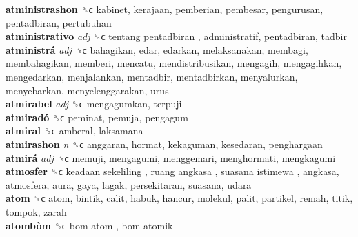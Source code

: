 \textbf{atministrashon} ␝ϲ  kabinet, kerajaan, pemberian, pembesar, pengurusan, pentadbiran, pertubuhan  \\
\textbf{atministrativo} \emph{adj}  ␝ϲ   tentang pentadbiran , administratif, pentadbiran, tadbir  \\
\textbf{atministrá} \emph{adj}  ␝ϲ  bahagikan, edar, edarkan, melaksanakan, membagi, membahagikan, memberi, mencatu, mendistribusikan, mengagih, mengagihkan, mengedarkan, menjalankan, mentadbir, mentadbirkan, menyalurkan, menyebarkan, menyelenggarakan, urus  \\
\textbf{atmirabel} \emph{adj}  ␝ϲ  mengagumkan, terpuji  \\
\textbf{atmiradó} ␝ϲ  peminat, pemuja, pengagum  \\
\textbf{atmiral} ␝ϲ  amberal, laksamana  \\
\textbf{atmirashon} \emph{n}  ␝ϲ  anggaran, hormat, kekaguman, kesedaran, penghargaan  \\
\textbf{atmirá} \emph{adj}  ␝ϲ  memuji, mengagumi, menggemari, menghormati, mengkagumi  \\
\textbf{atmosfer} ␝ϲ   keadaan sekeliling ,  ruang angkasa ,  suasana istimewa , angkasa, atmosfera, aura, gaya, lagak, persekitaran, suasana, udara  \\
\textbf{atom} ␝ϲ  atom, bintik, calit, habuk, hancur, molekul, palit, partikel, remah, titik, tompok, zarah  \\
\textbf{atombòm} ␝ϲ   bom atom ,  bom atomik   \\
